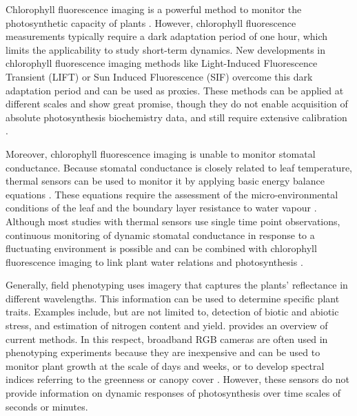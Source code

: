     Chlorophyll fluorescence imaging is a powerful method to monitor the photosynthetic capacity of plants \citep{bakerChlorophyll2008,murchieChlorophyll2013}. However, chlorophyll fluorescence measurements typically require a dark adaptation period of one hour, which limits the applicability to study short-term dynamics. New developments in chlorophyll fluorescence imaging methods like Light-Induced Fluorescence Transient (LIFT) or Sun Induced Fluorescence (SIF) overcome this dark adaptation period and can be used as proxies. These methods can be applied at different scales and show great promise, though they do not enable acquisition of absolute photosynthesis biochemistry data, and still require extensive calibration \citep{murchieDynamic2020,bandopadhyayReview2020}.
    
    Moreover, chlorophyll fluorescence imaging is unable to monitor stomatal conductance. Because stomatal conductance is closely related to leaf temperature, thermal sensors can be used to monitor it by applying basic energy balance equations \citep{jonesIrrigation2004,maesEstimating2012}. These equations require the assessment of the micro-environmental conditions of the leaf and the boundary layer resistance to water vapour \citep{jonesUse2002}. Although most studies with thermal sensors use single time point observations, continuous monitoring of dynamic stomatal conductance in response to a fluctuating environment is possible and can be combined with chlorophyll fluorescence imaging to link plant water relations and photosynthesis \citep{mcauslandEffects2016}. 
    
    Generally, field phenotyping uses imagery that captures the plants' reflectance in different wavelengths. This information can be used to determine specific plant traits. Examples include, but are not limited to, detection of biotic and abiotic stress, and estimation of nitrogen content and yield. \citet{mirHighthroughput2019} provides an overview of current methods. In this respect, broadband RGB cameras are often used in phenotyping experiments because they are inexpensive and can be used to monitor plant growth at the scale of days and weeks, or to develop spectral indices referring to the greenness or canopy cover \citep{borra-serranoClosing2020}. However, these sensors do not provide information on dynamic responses of photosynthesis over time scales of seconds or minutes.
    
